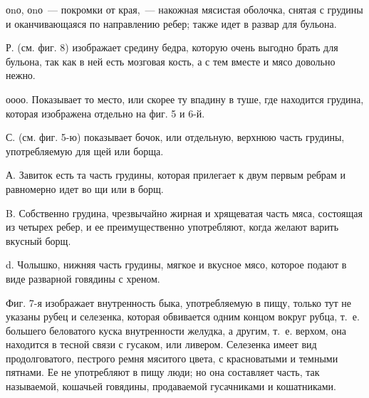 оnо, оnо~--- покромки от края,~--- накожная мясистая оболочка, снятая с грудины и оканчивающаяся по направлению ребер; также идет в развар для бульона.

Р. (см. фиг. 8) изображает средину бедра, которую очень выгодно брать для бульона, так как в ней есть мозговая кость, а с тем вместе и мясо довольно нежно.

оооо. Показывает то место, или скорее ту впадину в туше, где находится грудина, которая изображена отдельно на фиг. 5 и 6-й.

С. (см. фиг. 5-ю) показывает бочок, или отдельную, верхнюю часть грудины, употребляемую для щей или борща.

А. Завиток есть та часть грудины, которая прилегает к двум первым ребрам и равномерно идет во щи или в борщ.

B. Собственно грудина, чрезвычайно жирная и хрящеватая часть мяса, состоящая из четырех ребер, и ее преимущественно употребляют, когда желают варить вкусный борщ.

d. Чолышко, нижняя часть грудины, мягкое и вкусное мясо, которое подают в виде разварной говядины с хреном.

Фиг. 7-я изображает внутренность быка, употребляемую в пищу, только тут не указаны рубец и селезенка, которая обвивается одним концом вокруг рубца, т.~е. большего беловатого куска внутренности желудка, а другим, т.~е. верхом, она находится в тесной связи с гусаком, или ливером. Селезенка имеет вид продолговатого, пестрого ремня мяситого цвета, с красноватыми и темными пятнами. Ее не употребляют в пищу люди; но она составляет часть, так называемой, кошачьей говядины, продаваемой гусачниками и кошатниками.

